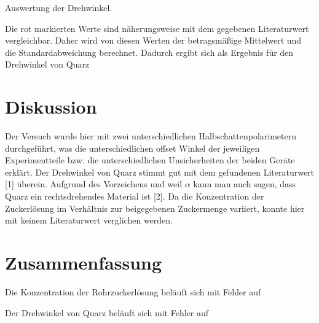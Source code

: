 \documentclass{article}
\begin{document}
\begin{table}[H]
\caption{Auswertung der Drehwinkel.}
\label{tab:kristall_auswertung}
\centering

\end{table}


Die rot markierten Werte sind näherungsweise mit dem gegebenen Literaturwert vergleichbar. Daher wird von diesen Werten der betragsmäßige Mittelwert und die Standardabweichung berechnet. Dadurch ergibt sich als Ergebnis für den Drehwinkel von Quarz 




\section{Diskussion}
Der Versuch wurde hier mit zwei unterschiedlichen Halbschattenpolarimetern durchgeführt, was die unterschiedlichen offset Winkel der jeweiligen Experimentteile bzw. die unterschiedlichen Unsicherheiten der beiden Geräte erklärt.
Der Drehwinkel von Quarz stimmt gut mit dem gefundenen Literaturwert [1] überein. Aufgrund des Vorzeichens und weil $\alpha$ kann man auch sagen, dass Quarz ein rechtsdrehendes Material ist [2].
Da die Konzentration der Zuckerlösung im Verhältnis zur beigegebenen Zuckermenge variiert, konnte hier mit keinem Literaturwert verglichen werden.



\section{Zusammenfassung}
Die Konzentration der Rohrzuckerlösung beläuft sich mit Fehler auf


Der Drehwinkel von Quarz beläuft sich mit Fehler auf







%

%


%
\end{document}
